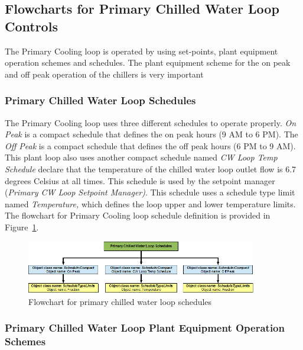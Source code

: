 \subsection{Flowcharts for Primary Chilled Water Loop Controls}\label{flowcharts-for-primary-chilled-water-loop-controls}

The Primary Cooling loop is operated by using set-points, plant equipment operation schemes and schedules. The plant equipment scheme for the on peak and off peak operation of the chillers is very important

\subsubsection{Primary Chilled Water Loop Schedules}\label{primary-chilled-water-loop-schedules}

The Primary Cooling loop uses three different schedules to operate properly. \emph{On Peak} is a compact schedule that defines the on peak hours (9 AM to 6 PM). The \emph{Off Peak} is a compact schedule that defines the off peak hours (6 PM to 9 AM). This plant loop also uses another compact schedule named \emph{CW Loop Temp Schedule} declare that the temperature of the chilled water loop outlet flow is 6.7 degrees Celsius at all times. This schedule is used by the setpoint manager (\emph{Primary CW Loop Setpoint Manager)}. This schedule uses a schedule type limit named \emph{Temperature,} which defines the loop upper and lower temperature limits. The flowchart for Primary Cooling loop schedule definition is provided in Figure~\ref{fig:flowchart-for-primary-chilled-water-loop-schedules}.

\begin{figure}[hbtp] %
\centering
\includegraphics[width=0.9\textwidth, height=0.9\textheight, keepaspectratio=true]{media/image099.png}
\caption{Flowchart for primary chilled water loop schedules \protect \label{fig:flowchart-for-primary-chilled-water-loop-schedules}}
\end{figure}

\subsubsection{Primary Chilled Water Loop Plant Equipment Operation Schemes}\label{primary-chilled-water-loop-plant-equipment-operation-schemes}

